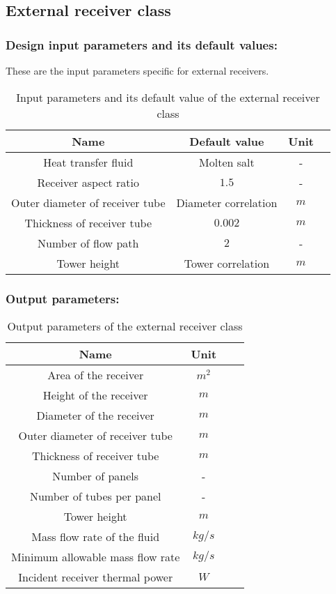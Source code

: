 \subsection{External receiver class}
\subsubsection{Design input parameters and its default values:}
These are the input parameters specific for external receivers. 
\begin{table}[h!]
	\begin{center}
		\begin{tabular}{ |c|c|c|c| } 
			\hline
			\textbf{Name} & \textbf{Default value} & \textbf{Unit} \\
			\hline
			Heat transfer fluid & Molten salt & - \\
			\hline
			Receiver aspect ratio & $1.5$ & - \\
			\hline
			Outer diameter of receiver tube & Diameter correlation & $m$ \\
			\hline
			Thickness of receiver tube & $0.002$ & $m$ \\
			\hline
			Number of flow path & $2$ & - \\
			\hline
			Tower height & Tower correlation & $m$ \\
			\hline
		\end{tabular}
		\caption{Input parameters and its default value of the external receiver class}
		\label{External receiver class input parameters}
	\end{center}
\end{table}
\subsubsection{Output parameters:} 
\begin{table}[h!]
	\begin{center}
		\begin{tabular}{ |c|c|c|c| } 
			\hline
			\textbf{Name} & \textbf{Unit} \\
			\hline
			Area of the receiver & $m^2$ \\
			\hline
		    Height of the receiver & $m$ \\
			\hline
			Diameter of the receiver & $m$ \\
			\hline
			Outer diameter of receiver tube & $m$ \\
		    \hline
			Thickness of receiver tube & $m$ \\
		    \hline
			Number of panels & - \\
			\hline
			Number of tubes per panel & - \\
			\hline
			Tower height & $m$ \\
			\hline
			Mass flow rate of the fluid & $kg/s$ \\
			\hline
			Minimum allowable mass flow rate & $kg/s$ \\
			\hline
			Incident receiver thermal power & $W$ \\
			\hline
		\end{tabular}
		\caption{Output parameters of the external receiver class}
		\label{External receiver class output parameters}
	\end{center}
\end{table}
